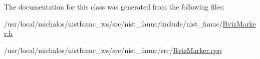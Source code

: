 The documentation for this class was generated from the following files\-:\begin{DoxyCompactItemize}
\item 
/usr/local/michalos/nistfanuc\-\_\-ws/src/nist\-\_\-fanuc/include/nist\-\_\-fanuc/\hyperlink{RvizMarker_8h}{Rviz\-Marker.\-h}\item 
/usr/local/michalos/nistfanuc\-\_\-ws/src/nist\-\_\-fanuc/src/\hyperlink{RvizMarker_8cpp}{Rviz\-Marker.\-cpp}\end{DoxyCompactItemize}
